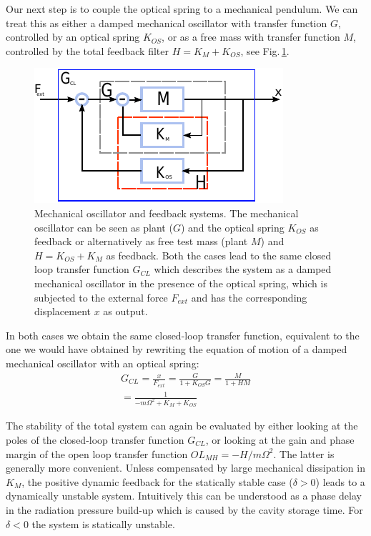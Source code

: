 Our next step is to couple the optical spring to a mechanical pendulum. We can treat this as either a damped mechanical oscillator with transfer function $G$, controlled by an optical spring $K_{OS}$, or as a free mass with transfer function $M$, controlled by the total feedback filter $H = K_M + K_{OS}$, see Fig.\,\ref{fig:blocks2}.
\begin{figure}[htbp]
	\centering
		\includegraphics[width=.7\textwidth]{figures/theory/blocks_paper.pdf}
	\caption[Mechanical oscillator and feedback systems]{Mechanical oscillator and feedback systems. The mechanical oscillator can be seen as plant ($G$) and the optical spring $K_{OS}$ as feedback or
	alternatively as free test mass (plant $M$) and $H=K_{OS}+K_M$ as feedback. 
	Both the cases lead to the same closed loop transfer function $G_{CL}$ which describes the system as a damped mechanical oscillator in the presence of
	the optical spring, which is subjected to the external force $F_{ext}$ and has the corresponding displacement $x$ as output.}
	\label{fig:blocks2}
\end{figure}
In both cases we obtain the same closed-loop transfer function, equivalent to the one we would have obtained by
rewriting the equation of motion of a damped mechanical oscillator with an optical spring:
\begin{align}
\label{eqn:TFco}
G_{CL}=\frac{x}{F_{ext}}=\frac{G}{1+K_{OS} G}=\frac{M}{1+H M}\nonumber\\
=\frac{1}{-m\Omega^2+K_M+K_{OS}}%
\end{align}

The stability of the total system can again be evaluated  by either looking at the poles of the closed-loop
transfer function $G_{CL}$, or looking at the gain and phase margin of the open loop transfer function $OL_{MH}=-H/m\Omega^2$. The latter is generally more convenient. Unless compensated by large mechanical dissipation in $K_M$, the positive dynamic feedback for the statically stable case ($\delta>0$) leads to a dynamically unstable system. 
Intuitively this can be understood as a phase delay in the radiation pressure build-up which is caused by the cavity storage time.
For $\delta<0$ the system is statically unstable.

